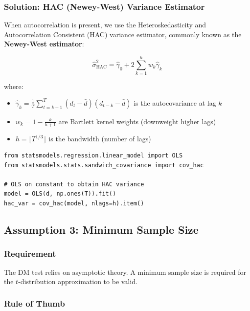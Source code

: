 \documentclass[11pt,a4paper]{article}
\begin{document}
\subsubsection*{Solution: HAC (Newey-West) Variance Estimator}

When autocorrelation is present, we use the Heteroskedasticity and Autocorrelation Consistent (HAC) variance estimator, commonly known as the \textbf{Newey-West estimator}:

\begin{equation}
\hat{\sigma}^2_{\text{HAC}} = \hat{\gamma}_0 + 2 \sum_{k=1}^{h} w_k \hat{\gamma}_k
\end{equation}

where:
\begin{itemize}
    \item $\hat{\gamma}_k = \frac{1}{T} \sum_{t=k+1}^{T} (d_t - \bar{d})(d_{t-k} - \bar{d})$ is the autocovariance at lag $k$
    \item $w_k = 1 - \frac{k}{h+1}$ are Bartlett kernel weights (downweight higher lags)
    \item $h = \lfloor T^{1/3} \rfloor$ is the bandwidth (number of lags)
\end{itemize}

\begin{lstlisting}[caption={HAC Variance Estimation}]
from statsmodels.regression.linear_model import OLS
from statsmodels.stats.sandwich_covariance import cov_hac

# OLS on constant to obtain HAC variance
model = OLS(d, np.ones(T)).fit()
hac_var = cov_hac(model, nlags=h).item()
\end{lstlisting}

\subsection{Assumption 3: Minimum Sample Size}

\subsubsection*{Requirement}

The DM test relies on asymptotic theory. A minimum sample size is required for the $t$-distribution approximation to be valid.

\subsubsection*{Rule of Thumb}
\end{document}

